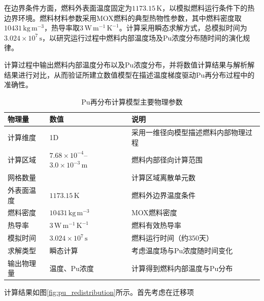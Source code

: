在边界条件方面，燃料外表面温度固定为$1173.15\,\mathrm{K}$，以模拟燃料运行条件下的热边界环境。燃料材料参数采用MOX燃料的典型热物性参数，其中燃料密度取$10431\,\mathrm{kg\,m^{-3}}$，热导率取$3\,\mathrm{W\,m^{-1}\,K^{-1}}$。计算采用瞬态求解方式，总模拟时间为$3.024\times10^{7}\,\mathrm{s}$，以研究运行过程中燃料内部温度场及Pu浓度分布随时间的演化规律。

计算过程中输出燃料内部温度分布以及Pu浓度分布，并将数值计算结果与解析解结果进行对比，从而验证所建立数值模型在描述温度梯度驱动Pu再分布过程中的准确性。

\begin{table}[htbp]
	\centering
	\caption{Pu再分布计算模型主要物理参数}
	\label{tab:pu_parameters}
	
	\begin{tabularx}{\textwidth}{@{}
			>{\centering\arraybackslash}m{2.2cm}
			>{\centering\arraybackslash}m{4.2cm}
			>{\centering\arraybackslash}X
			@{}}
		\toprule
		物理量 & 数值 & 说明 \\
		\midrule
		
		计算维度 & 1D & 采用一维径向模型描述燃料内部物理过程 \\
		
		计算区域 & $7.68\times10^{-4}$--$3.0\times10^{-3}\,\mathrm{m}$ 
		& 燃料内部径向计算范围 \\
		
		网格数量 & 100 & 计算区域离散单元数 \\
		
		外表面温度 & $1173.15\,\mathrm{K}$ & 燃料外边界温度条件 \\
		
		燃料密度 & $10431\,\mathrm{kg\,m^{-3}}$ & MOX燃料密度 \\
		
		热导率 & $3\,\mathrm{W\,m^{-1}\,K^{-1}}$ & 燃料有效热导率 \\
		
		模拟时间 & $3.024\times10^{7}\,\mathrm{s}$ & 燃料运行时间（约350天） \\
		
		求解类型 & 瞬态计算 & 考虑温度场与Pu浓度随时间变化 \\
		
		输出物理量 & 温度、Pu浓度 & 计算得到燃料内部温度与Pu分布 \\
		
		\bottomrule
	\end{tabularx}
	
\end{table}
计算结果如图\ref{fig:pu_redistribution}所示。首先考虑在迁移项
